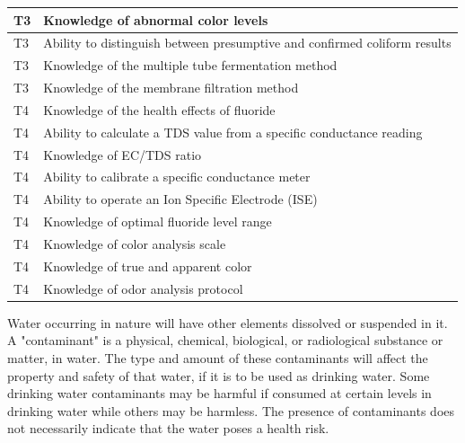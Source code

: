 \begin{table}[H]
\begin{tabular}{| m{1cm} |m{15cm} |}
T3 & Knowledge of abnormal   color levels                                                              \\ \hline
T3 & Ability to   distinguish between presumptive and confirmed coliform results                       \\ \hline
T3 & Knowledge of the   multiple tube fermentation method                                              \\ \hline
T3 & Knowledge of the   membrane filtration method                                                     \\ \hline
T4 & Knowledge of the   health effects of fluoride                                                     \\ \hline
T4 & Ability to calculate   a TDS value from a specific conductance reading                            \\ \hline
T4 & Knowledge of EC/TDS   ratio                                                                       \\ \hline
T4 & Ability to calibrate   a specific conductance meter                                               \\ \hline
T4 & Ability to operate an   Ion Specific Electrode (ISE)                                              \\ \hline
T4 & Knowledge of optimal   fluoride level range                                                       \\ \hline
T4 & Knowledge of color   analysis scale                                                               \\ \hline
T4 & Knowledge of true and   apparent color                                                            \\ \hline
T4 & Knowledge of odor   analysis protocol                                                             \\ \hline
\end{tabular}
\end{table}

\newpage
Water occurring in nature will have other elements dissolved or suspended in it. A "contaminant" is a physical, chemical, biological, or radiological substance or matter, in water.  The type and amount of these contaminants will affect the property and safety of that water, if it is to be used as drinking water.  Some drinking water contaminants may be harmful if consumed at certain levels in drinking water while others may be harmless. The presence of contaminants does not necessarily indicate that the water poses a health risk.\\

